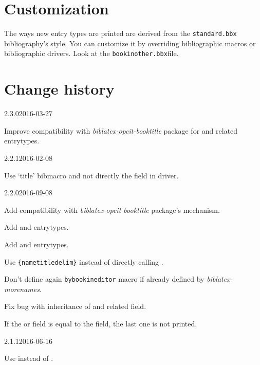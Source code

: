 \documentclass{ltxdockit}[2011/03/25]
\begin{document}
\section{Customization}

The ways new entry types are printed are derived from the \verb+standard.bbx+ bibliography's style. You can customize it by overriding bibliographic macros or bibliographic drivers. Look at the \verb+bookinother.bbx+file.

\section{Change history}


\begin{changelog}

\begin{release}{2.3.0}{2016-03-27}
  \item Improve compatibility with \emph{biblatex-opcit-booktitle} package for  and related entrytypes.
\end{release}

\begin{release}{2.2.1}{2016-02-08}
  \item Use `title' bibmacro and not directly the field in  driver.
\end{release}

\begin{release}{2.2.0}{2016-09-08}
  \item Add compatibility with \emph{biblatex-opcit-booktitle} package's mechanism.
  \item Add  and  entrytypes.
  \item Add  and  entrytypes.
  \item Use \verb+{nametitledelim}+ instead of directly  calling .
  \item Don't define again \verb+bybookineditor+ macro if already defined by \emph{biblatex-morenames}.
  \item Fix bug with inheritance of  and related field.
  \item If the  or  field is equal to the field, the last one is not printed.
\end{release}

\begin{release}{2.1.1}{2016-06-16}
  \item Use  instead of .
\end{release}


\end{changelog}
\end{document}
